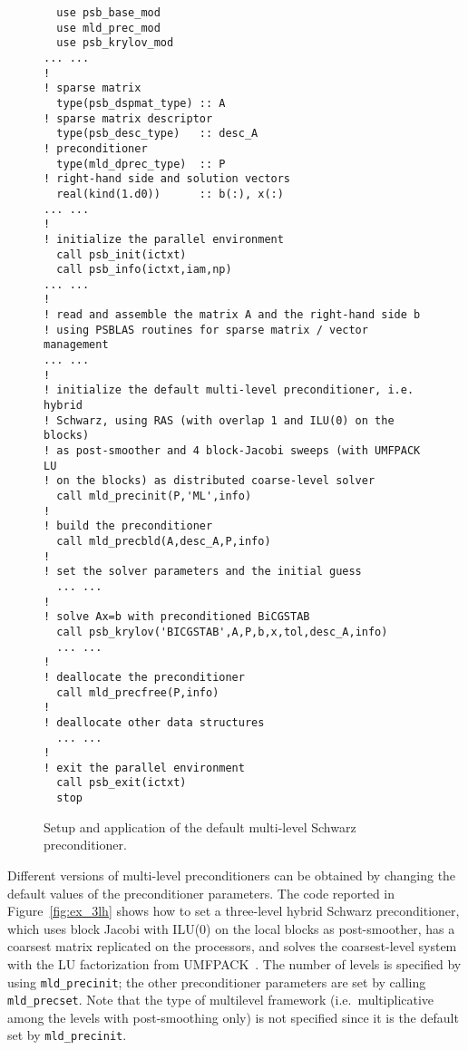 \begin{figure}[tbp]
\begin{center}
\begin{minipage}{.90\textwidth} 
{\small
\begin{verbatim}
  use psb_base_mod
  use mld_prec_mod
  use psb_krylov_mod
... ...
!
! sparse matrix
  type(psb_dspmat_type) :: A
! sparse matrix descriptor
  type(psb_desc_type)   :: desc_A
! preconditioner
  type(mld_dprec_type)  :: P
! right-hand side and solution vectors
  real(kind(1.d0))      :: b(:), x(:)
... ...
!
! initialize the parallel environment
  call psb_init(ictxt)
  call psb_info(ictxt,iam,np)
... ...
!
! read and assemble the matrix A and the right-hand side b 
! using PSBLAS routines for sparse matrix / vector management 
... ...
!
! initialize the default multi-level preconditioner, i.e. hybrid
! Schwarz, using RAS (with overlap 1 and ILU(0) on the blocks) 
! as post-smoother and 4 block-Jacobi sweeps (with UMFPACK LU
! on the blocks) as distributed coarse-level solver
  call mld_precinit(P,'ML',info)
!
! build the preconditioner
  call mld_precbld(A,desc_A,P,info)
!
! set the solver parameters and the initial guess
  ... ...
!
! solve Ax=b with preconditioned BiCGSTAB
  call psb_krylov('BICGSTAB',A,P,b,x,tol,desc_A,info)
  ... ...
!
! deallocate the preconditioner
  call mld_precfree(P,info)
!
! deallocate other data structures
  ... ...
!
! exit the parallel environment
  call psb_exit(ictxt)
  stop
\end{verbatim}
}
\end{minipage}
\caption{Setup and application of the default multi-level Schwarz preconditioner.
\label{fig:ex_default}}
\end{center}
\end{figure}

Different versions of multi-level preconditioners can be obtained by changing
the default values of the preconditioner parameters. The code reported in
Figure~\ref{fig:ex_3lh} shows how to set a three-level hybrid Schwarz
preconditioner, which uses block Jacobi with ILU(0) on the
local blocks as post-smoother, has a coarsest matrix replicated on the processors,
and solves the coarsest-level system with the LU factorization from UMFPACK~\cite{UMFPACK}.
The number of levels is specified by using \verb|mld_precinit|; the other
preconditioner parameters are set by calling \verb|mld_precset|. Note that
the type of multilevel framework (i.e.\ multiplicative among the levels
with post-smoothing only) is not specified since it is the default 
set by \verb|mld_precinit|. 

